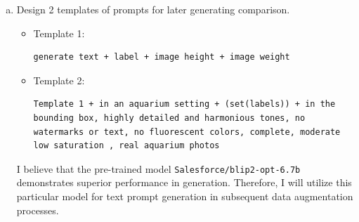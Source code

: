 \documentclass[10pt,a4paper]{article}
\begin{document}
\begin{enumerate}[(a)]
\item Design 2 templates of prompts for later generating comparison.
\begin{itemize}
\item Template 1: 
\begin{lstlisting}[frame=single]
generate text + label + image height + image weight
\end{lstlisting}

\item Template 2: 
\begin{lstlisting}[frame=single]
Template 1 + in an aquarium setting + (set(labels)) + in the bounding box, highly detailed and harmonious tones, no watermarks or text, no fluorescent colors, complete, moderate low saturation , real aquarium photos
\end{lstlisting}
\end{itemize}


I believe that the pre-trained model \verb|Salesforce/blip2-opt-6.7b| demonstrates superior performance in generation. Therefore, I will utilize this particular model for text prompt generation in subsequent data augmentation processes.

\end{enumerate}
\end{document}
